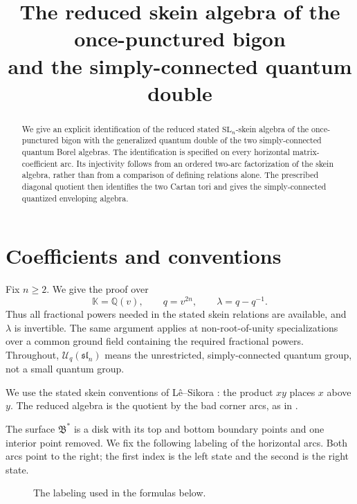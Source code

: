 \documentclass[11pt]{amsart}
\title{The reduced skein algebra of the once-punctured bigon\\
and the simply-connected quantum double}
\date{}
\theoremstyle{remark}
\newcommand{\kk}{\mathbb{K}}
\newcommand{\UU}{\mathcal U_q}
\newcommand{\Bstar}{\mathfrak B^{*}}
\newcommand{\slie}{\mathfrak{sl}_n}
\begin{document}
\maketitle

\begin{abstract}
We give an explicit identification of the reduced stated
$\mathrm{SL}_n$-skein algebra of the once-punctured bigon with the
generalized quantum double of the two simply-connected quantum
Borel algebras.  The identification is specified on every horizontal
matrix-coefficient arc.  Its injectivity follows from an ordered
two-arc factorization of the skein algebra, rather than from a
comparison of defining relations alone.  The prescribed diagonal
quotient then identifies the two Cartan tori and gives the
simply-connected quantized enveloping algebra.
\end{abstract}

\section{Coefficients and conventions}

Fix $n\geq 2$.  We give the proof over
\[
  \kk=\mathbb Q(v),\qquad q=v^{2n},\qquad
  \lambda=q-q^{-1}.
\]
Thus all fractional powers needed in the stated skein relations are
available, and $\lambda$ is invertible.  The same argument applies
at non-root-of-unity specializations over a common ground field
containing the required fractional powers.  Throughout,
$\UU(\slie)$ means the unrestricted, simply-connected quantum group,
not a small quantum group.

We use the stated skein conventions of L\^e--Sikora
\cite{LS}: the product $xy$ places $x$ above $y$.
The reduced algebra is the quotient by the bad corner arcs, as in
\cite[Section~7.1]{LY}.

The surface $\Bstar$ is a disk with its top and bottom boundary
points and one interior point removed.  We fix the following
labeling of the horizontal arcs.  Both arcs point to the right;
the first index is the left state and the second is the right state.

\begin{figure}[ht]
\centering
{}
\caption{The labeling used in the formulas below.}
\label{fig:bigon}
\end{figure}
\end{document}
